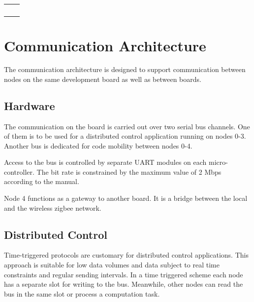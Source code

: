 \documentclass{scrreprt}
\begin{document}
\begin{longtable}{|l|p{5in}|}
\\
\hline

&

\\
\hline

&

\\
\hline

&

\\
\hline

&

\\
\hline

&

\\
\hline

\end{longtable}

\chapter{Communication Architecture}
The communication architecture is designed to support communication 
between nodes on the same development board as well as between boards.


\section{Hardware}

The communication on the board is carried out
over two serial bus channels. One of them is to be used for a distributed control
application running on nodes 0-3. Another bus is dedicated for code mobility between nodes 0-4.

Access to the bus is controlled by separate UART modules on each
micro-controller. The bit rate is constrained by the maximum value of 2 Mbps according to the manual.  

Node 4 functions as a gateway to another board. It is a bridge between the local
and the wireless zigbee network.

\section{Distributed Control} 
Time-triggered protocols are customary for distributed control applications.
This approach is suitable for low data volumes and data subject to real time
constraints and regular sending intervals. 
In a time triggered scheme each node has a separate slot for writing to the bus.
Meanwhile, other nodes can read the bus in the same slot or process a computation task.
\end{document}

